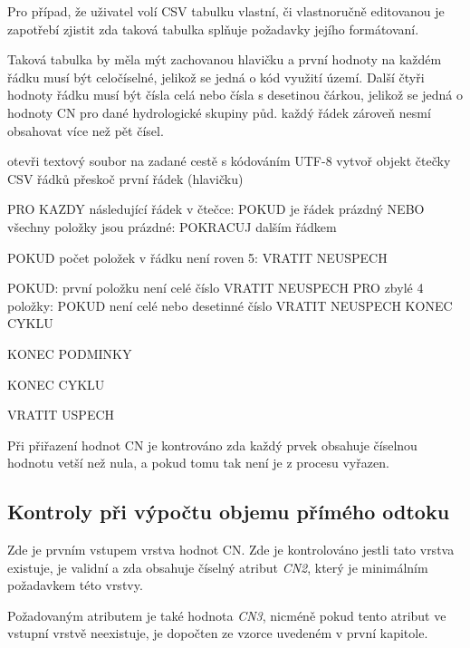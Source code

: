 \documentclass[a4paper,oneside,12pt]{book}
\begin{document}
\hspace{10mm} Pro případ, že uživatel volí CSV tabulku vlastní, či vlastnoručně editovanou je zapotřebí zjistit zda taková tabulka splňuje požadavky jejího formátovaní. 

\hspace{10mm} Taková tabulka by měla mýt zachovanou hlavičku a první hodnoty na každém řádku musí být celočíselné, jelikož se jedná o kód využití území. Další čtyři hodnoty řádku musí být čísla celá nebo čísla s desetinou čárkou, jelikož se jedná o hodnoty CN pro dané hydrologické skupiny půd. každý řádek zároveň nesmí obsahovat více než pět čísel.



\begin{pseudocode}[style=mypseudocode, caption={Ukázka kontroly CSV souboru},label={kod:csv_check}]
otevři textový soubor na zadané cestě s kódováním UTF-8
vytvoř objekt čtečky CSV řádků
přeskoč první řádek (hlavičku)

PRO KAZDY následující řádek v čtečce:
    POKUD je řádek prázdný NEBO všechny položky jsou prázdné:
        POKRACUJ dalším řádkem
    
    POKUD počet položek v řádku není roven 5:
        VRATIT NEUSPECH
    

    POKUD:
        první položku není celé číslo
        VRATIT NEUSPECH
        PRO zbylé 4 položky:
            POKUD není celé nebo desetinné číslo
            VRATIT NEUSPECH
            KONEC CYKLU

    KONEC PODMINKY
    
KONEC CYKLU

VRATIT USPECH
\end{pseudocode}

\hspace{10mm} Při přiřazení hodnot CN je kontrováno zda každý prvek obsahuje číselnou hodnotu vetší než nula, a pokud tomu tak není je z procesu vyřazen.

\subsection{Kontroly při výpočtu objemu přímého odtoku} 
\label{runoff_checks}
\hspace{10mm} Zde je prvním vstupem vrstva hodnot CN. Zde je kontrolováno jestli tato vrstva existuje, je validní a zda obsahuje číselný atribut \textit{CN2}, který je minimálním požadavkem této vrstvy.

\hspace{10mm} Požadovaným atributem je také hodnota \textit{CN3}, nicméně pokud tento atribut ve vstupní vrstvě neexistuje, je dopočten ze vzorce uvedeném v první kapitole.
\end{document}
